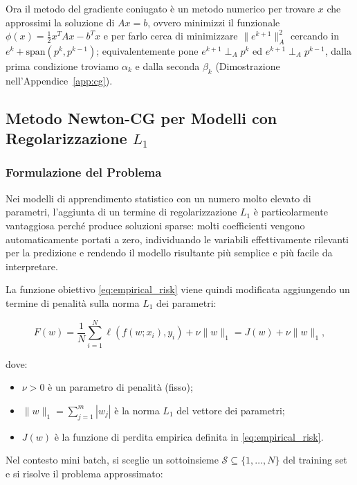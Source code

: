 \documentclass[a4paper,12pt]{article}
\numberwithin{equation}{section}
\numberwithin{figure}{section}
\numberwithin{table}{section}
\begin{document}
Ora il metodo del gradiente coniugato è un metodo numerico per trovare \(x\) che approssimi la soluzione di \(Ax = b\), ovvero minimizzi il funzionale $
\phi(x) = \frac{1}{2}x^T A x - b^T x$
e per farlo cerca di minimizzare \(\|e^{k+1}\|_A^2\) cercando in \(e^k + \text{span}(p^k, p^{k-1})\); equivalentemente pone \(e^{k+1} \perp_A p^k\) ed \(e^{k+1} \perp_A p^{k-1}\), dalla prima condizione troviamo \(\alpha_k\) e dalla seconda \(\beta_k\) (Dimostrazione nell'Appendice~\ref{app:cg}).
\newpage

\subsection{Metodo Newton-CG per Modelli con Regolarizzazione $L_1$}\label{sec:l1}

\subsubsection{Formulazione del Problema}

Nei modelli di apprendimento statistico con un numero molto elevato di parametri,
l'aggiunta di un termine di regolarizzazione $L_1$ è particolarmente vantaggiosa
perché produce soluzioni sparse: molti coefficienti vengono
automaticamente portati a zero, individuando le variabili effettivamente
rilevanti per la predizione e rendendo il modello risultante più semplice e
più facile da interpretare.

La funzione obiettivo \eqref{eq:empirical_risk} viene quindi modificata aggiungendo un termine di
penalità sulla norma $L_1$ dei parametri:

\begin{equation}
F(w) = \frac{1}{N}\sum_{i=1}^{N} \ell(f(w;x_i),y_i) + \nu \|w\|_1 = J(w) + \nu \|w\|_1, \tag{5.41}\label{eq:5_41}
\end{equation}

dove:
\begin{itemize}
    \item $\nu > 0$ è un parametro di penalità (fisso);
    \item $\|w\|_1 = \sum_{j=1}^{m} |w_j|$ è la norma $L_1$ del vettore dei parametri;
    \item $J(w)$ è la funzione di perdita empirica definita in \eqref{eq:empirical_risk}.
\end{itemize}

Nel contesto mini batch, si sceglie un sottoinsieme $\mathcal{S} \subseteq \{1,\dots,N\}$
del training set e si risolve il problema approssimato:
\end{document}
